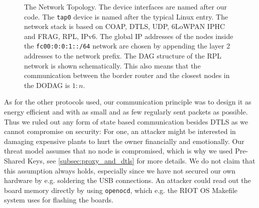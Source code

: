 \documentclass[acmtog, language=english, nonacm]{acmart}
\begin{document}
\begin{figure}[!hbtp]
        \caption{The Network Topology. The device interfaces are named after our code. The \texttt{tap0} device is named after the typical Linux entry. The network stack is based on COAP, DTLS, UDP, 6LoWPAN IPHC and FRAG, RPL, IPv6. The global IP addresses of the nodes inside the \texttt{fc00:0:0:1::/64} network are chosen by appending the layer 2 addresses to the network prefix. The DAG structure of the RPL network is shown schematically. This also means that the communication between the border router and the closest nodes in the DODAG is \(1:n\).}
        \label{fig:network_structure}
    \end{figure}

    As for the other protocols used, our communication principle was to design it as energy efficient and with as small and as few regularly sent packets as possible. Thus we ruled out any form of state based communication besides DTLS as we cannot compromise on security: For one, an attacker might be interested in damaging expensive plants to hurt the owner financially and emotionally. Our threat model assumes that no node is compromised, which is why we used Pre-Shared Keys, see \cref{subsec:proxy_and_dtls} for more details. We do not claim that this assumption always holds, especially since we have not secured our own hardware by e.g. soldering the USB connections. An attacker could read out the board memory directly by using \texttt{openocd}, which e.g. the RIOT OS Makefile system uses for flashing the boards.
\end{document}
